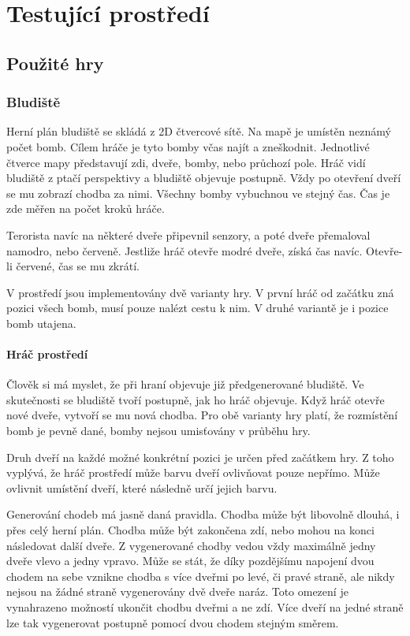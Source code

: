 \chapter{Testující prostředí}

\section{Použité hry}

\subsection{Bludiště}

Herní plán bludiště se skládá z 2D čtvercové sítě. Na mapě je umístěn neznámý počet bomb. Cílem hráče je tyto bomby včas najít a zneškodnit. Jednotlivé čtverce mapy představují zdi, dveře, bomby, nebo průchozí pole. Hráč vidí bludiště z ptačí perspektivy a bludiště objevuje postupně. Vždy po otevření dveří se mu zobrazí chodba za nimi. Všechny bomby vybuchnou ve stejný čas. Čas je zde měřen na počet kroků hráče.

Terorista navíc na některé dveře připevnil senzory, a poté dveře přemaloval namodro, nebo červeně. Jestliže hráč otevře modré dveře, získá čas navíc. Otevře-li červené, čas se mu zkrátí.

V prostředí jsou implementovány dvě varianty hry. V první hráč od začátku zná pozici všech bomb, musí pouze nalézt cestu k nim. V druhé variantě je i pozice bomb utajena.

\subsubsection{Hráč prostředí}

Člověk si má myslet, že při hraní objevuje již předgenerované bludiště. Ve skutečnosti se bludiště tvoří postupně, jak ho hráč objevuje. Když hráč otevře nové dveře, vytvoří se mu nová chodba. Pro obě varianty hry platí, že rozmístění bomb je pevně dané, bomby nejsou umisťovány v průběhu hry. 

Druh dveří na každé možné konkrétní pozici je určen před začátkem hry. Z toho vyplývá, že hráč prostředí může barvu dveří ovlivňovat pouze nepřímo. Může ovlivnit umístění dveří, které následně určí jejich barvu.

Generování chodeb má jasně daná pravidla. Chodba může být libovolně dlouhá, i přes celý herní plán. Chodba může být zakončena zdí, nebo mohou na konci následovat další dveře. Z vygenerované chodby vedou vždy maximálně jedny dveře vlevo a jedny vpravo. Může se stát, že díky pozdějšímu napojení dvou chodem na sebe vznikne chodba s více dveřmi po levé, či pravé straně, ale nikdy nejsou na žádné straně vygenerovány dvě dveře naráz. Toto omezení je vynahrazeno možností ukončit chodbu dveřmi a ne zdí. Více dveří na jedné straně lze tak vygenerovat postupně pomocí dvou chodem stejným směrem.

